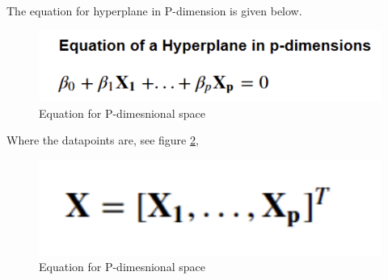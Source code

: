 \documentclass[format=sigconf]{acmart}
\begin{document}
The equation for hyperplane in P-dimension is given below.
\begin{figure}[H]
    \centering
    \includegraphics[scale=0.40]{images/SVM_Equation_for_p-dimension.png}
    \caption{Equation for P-dimesnional space}
    \label{fig:svm_dimension_equation}
\end{figure}

Where the datapoints are, see figure \ref{fig:svm_datapoints},
\begin{figure}[H]
    \centering
    \includegraphics[scale=0.40]{images/svm_data_points.png}
    \caption{Equation for P-dimesnional space}
    \label{fig:svm_datapoints}
\end{figure}
\end{document}
